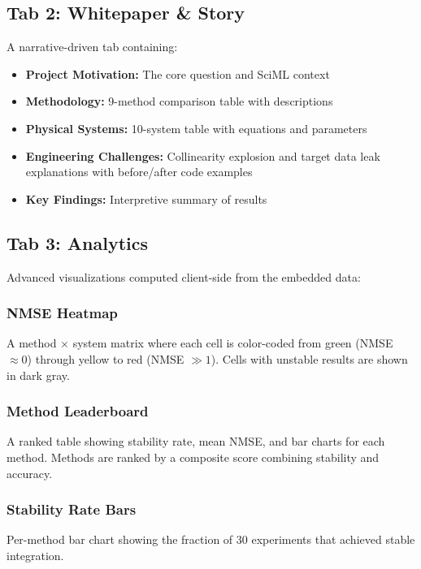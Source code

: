 \subsection{Tab 2: Whitepaper \& Story}
A narrative-driven tab containing:
\begin{itemize}
    \item \textbf{Project Motivation:} The core question and SciML context
    \item \textbf{Methodology:} 9-method comparison table with descriptions
    \item \textbf{Physical Systems:} 10-system table with equations and parameters
    \item \textbf{Engineering Challenges:} Collinearity explosion and target data leak explanations with before/after code examples
    \item \textbf{Key Findings:} Interpretive summary of results
\end{itemize}

\subsection{Tab 3: Analytics}
Advanced visualizations computed client-side from the embedded data:

\subsubsection{NMSE Heatmap}
A method $\times$ system matrix where each cell is color-coded from green (NMSE $\approx 0$) through yellow to red (NMSE $\gg 1$). Cells with unstable results are shown in dark gray.

\subsubsection{Method Leaderboard}
A ranked table showing stability rate, mean NMSE, and bar charts for each method. Methods are ranked by a composite score combining stability and accuracy.

\subsubsection{Stability Rate Bars}
Per-method bar chart showing the fraction of 30 experiments that achieved stable integration.

